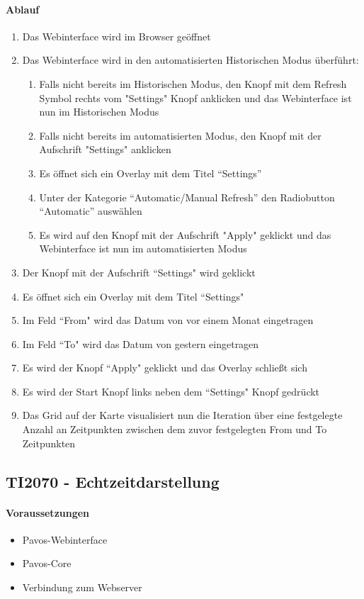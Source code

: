 \paragraph{Ablauf}
\begin{enumerate}
\item Das Webinterface wird im Browser geöffnet
\item Das Webinterface wird in den automatisierten Historischen Modus überführt:
\begin{enumerate}
\item Falls nicht bereits im Historischen Modus, den Knopf mit dem Refresh Symbol rechts vom "Settings" Knopf anklicken und das Webinterface ist nun im Historischen Modus
\item Falls nicht bereits im automatisierten Modus, den Knopf mit der Aufschrift "Settings" anklicken
\item Es öffnet sich ein Overlay mit dem Titel ``Settings''
\item Unter der Kategorie ``Automatic/Manual Refresh'' den Radiobutton ``Automatic'' auswählen
\item Es wird auf den Knopf mit der Aufschrift "Apply" geklickt und das Webinterface ist nun im automatisierten Modus
\end{enumerate}
\item Der Knopf mit der Aufschrift ``Settings" wird geklickt
\item Es öffnet sich ein Overlay mit dem Titel ``Settings"
\item Im Feld ``From" wird das Datum von vor einem Monat eingetragen
\item Im Feld ``To" wird das Datum von gestern eingetragen
\item Es wird der Knopf ``Apply" geklickt und das Overlay schließt sich
\item Es wird der Start Knopf links neben dem ``Settings" Knopf gedrückt
\item Das Grid auf der Karte visualisiert nun die Iteration über eine festgelegte Anzahl an Zeitpunkten zwischen dem zuvor festgelegten From und To Zeitpunkten
\end{enumerate}
\szenarioGood

\subsection{TI2070 - Echtzeitdarstellung}
\paragraph{Voraussetzungen}
\begin{itemize}
\item Pavos-Webinterface
\item Pavos-Core
\item Verbindung zum Webserver
\end{itemize}
